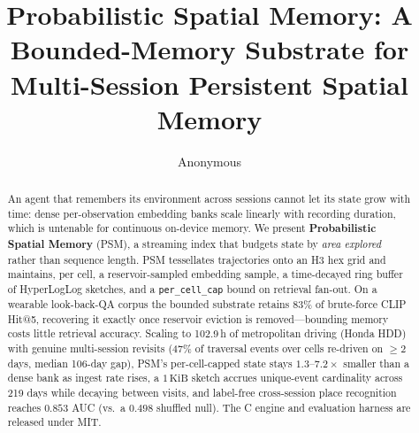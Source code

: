 \documentclass[runningheads]{llncs}
\title{Probabilistic Spatial Memory: A Bounded-Memory Substrate
for Multi-Session Persistent Spatial Memory}
\author{Anonymous}
\institute{Anonymous Institution\\\email{anon@example.com}}
\newcommand{\psm}{\textsc{PSM}\xspace}
\newcommand{\caponek}{\texttt{per\_cell\_cap}\xspace}
\begin{document}
\maketitle

\begin{abstract}
An agent that remembers its environment across sessions cannot let its
state grow with time: dense per-observation embedding banks scale
linearly with recording duration, which is untenable for continuous
on-device memory. We present \textbf{Probabilistic Spatial Memory}
(\psm{}), a streaming index that budgets state by \emph{area explored}
rather than sequence length. \psm{} tessellates trajectories onto an H3
hex grid and maintains, per cell, a reservoir-sampled embedding sample,
a time-decayed ring buffer of HyperLogLog sketches, and a
\caponek{} bound on retrieval fan-out. On a wearable look-back-QA corpus
the bounded substrate retains 83\% of brute-force CLIP Hit@5, recovering
it exactly once reservoir eviction is removed---bounding memory costs
little retrieval accuracy. Scaling to 102.9\,h of metropolitan
driving (Honda HDD) with genuine multi-session revisits (47\% of
traversal events over cells re-driven on $\geq2$ days, median 106-day
gap), \psm{}'s per-cell-capped state stays $1.3$--$7.2\times$ smaller
than a dense bank as ingest rate rises, a $1\,\mathrm{KiB}$ sketch
accrues unique-event cardinality across 219 days while decaying between
visits, and label-free cross-session place recognition reaches
$0.853$ AUC (vs.\ a $0.498$ shuffled null). The C engine and
evaluation harness are released under MIT.
\end{abstract}







\end{document}
